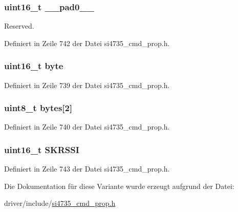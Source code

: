 \subsubsection[{\+\_\+\+\_\+pad0\+\_\+\+\_\+}]{\setlength{\rightskip}{0pt plus 5cm}uint16\+\_\+t \+\_\+\+\_\+pad0\+\_\+\+\_\+}\label{unionfm__seek__tune__rssi__thres_a77132c2c26a75f5b8751b235cda23828}


Reserved. 



Definiert in Zeile 742 der Datei si4735\+\_\+cmd\+\_\+prop.\+h.

\hypertarget{unionfm__seek__tune__rssi__thres_ab0549c1b5ea980a02e7eab77e21fea49}{}
\subsubsection[{byte}]{\setlength{\rightskip}{0pt plus 5cm}uint16\+\_\+t byte}\label{unionfm__seek__tune__rssi__thres_ab0549c1b5ea980a02e7eab77e21fea49}


Definiert in Zeile 739 der Datei si4735\+\_\+cmd\+\_\+prop.\+h.

\hypertarget{unionfm__seek__tune__rssi__thres_a46e4c05d20a047ec169f60d3167e912e}{}
\subsubsection[{bytes}]{\setlength{\rightskip}{0pt plus 5cm}uint8\+\_\+t bytes\mbox{[}2\mbox{]}}\label{unionfm__seek__tune__rssi__thres_a46e4c05d20a047ec169f60d3167e912e}


Definiert in Zeile 740 der Datei si4735\+\_\+cmd\+\_\+prop.\+h.

\hypertarget{unionfm__seek__tune__rssi__thres_aa2c04a5a0172c82e128c710e747f345e}{}
\subsubsection[{S\+K\+R\+S\+S\+I}]{\setlength{\rightskip}{0pt plus 5cm}uint16\+\_\+t S\+K\+R\+S\+S\+I}\label{unionfm__seek__tune__rssi__thres_aa2c04a5a0172c82e128c710e747f345e}


Definiert in Zeile 743 der Datei si4735\+\_\+cmd\+\_\+prop.\+h.



Die Dokumentation für diese Variante wurde erzeugt aufgrund der Datei\+:\begin{DoxyCompactItemize}
\item 
driver/include/\hyperlink{si4735__cmd__prop_8h}{si4735\+\_\+cmd\+\_\+prop.\+h}\end{DoxyCompactItemize}
